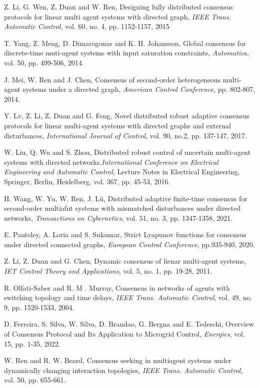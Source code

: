 \documentclass[journal,twoside]{IEEEtran}
\def\TAC{{\it IEEE Trans. Automat. Contr.}}
\def\AUT{{\it Automatica}}
\def\TAC{{\it IEEE Trans. Automatic Control}}
\def\IJC{{\it International Journal of Control}}
\def\AUT{{\it Automatica}}
\begin{document}
\begin{thebibliography}{00}
Z. Li, G. Wen, Z. Duan and W. Ren, Designing fully distributed consensus protocols for linear multi agent systems with directed graph, \TAC, vol. 60, no. 4, pp. 1152-1157, 2015


T. Yang, Z. Meng, D. Dimarogonas and K. H. Johansson, Global consensus for discrete-time muti-agent systems with input saturation constraints, \AUT, vol. 50, pp. 499-506, 2014.


J. Mei, W. Ren and J. Chen, Consensus of second-order heterogeneous multi-agent systems under a directed graph, {\it American Control Conference}, pp. 802-807, 2014.



Y. Lv, Z. Li, Z. Duan and G. Feng, Novel distributed robust adaptive consensus protocols for linear multi-agent systems with directed graphs and external disturbances, \IJC, vol. 90, no.2, pp. 137-147, 2017.


W. Liu, Q. Wu and S. Zhou, Distributed robust control of uncertain multi-agent systems with directed networks.{\it International Conference on Electrical Engineering and Automatic Control},  Lecture Notes in Electrical Engineering, Springer, Berlin, Heidelberg,  vol.  367,  pp. 45-53, 2016.

H. Wang, W. Yu, W. Ren, J. L\'{u}, Distributed adaptive finite-time consensus for second-order multiafnt systems with mismatched disturbances under directed networks, {\it Transactions on Cybernetics}, vol. 51, no. 3, pp. 1347-1358, 2021.

E. Panteley, A. Loria and S. Sukumar, Strict Lyapunov functions for consensus under directed connected graphs, {\it European Control Conference}, pp.935-940, 2020. 


Z. Li, Z. Duan and G. Chen, Dynamic consensus of lienar multi-agent systems, {\it IET Control Theory and Applications}, vol. 5, no. 1, pp. 19-28, 2011.


R. Olfati-Saber and R. M . Murray, Consensus in networks of agents with switching topology and time delays, \TAC, vol. 49, no. 9, pp. 1520-1533, 2004. 

D. Ferreira, S. Silva, W. Silva, D. Brandao, G. Bergna and E. Tedeschi, Overview of Consensus Protocol and Its Application to Microgrid Control, {\it Energies}, vol. 15, pp. 1-35, 2022.

W. Ren and R. W. Beard, Consensus seeking in multiagent systems under dynamically changing interaction topologies, \TAC, vol. 50, pp. 655-661.



\end{thebibliography}
\end{document}
